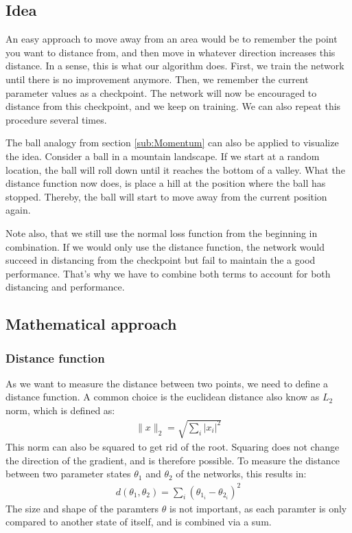 \subsection{Idea}
An easy approach to move away from an area would be to remember the point you
want to distance from, and then move in whatever direction increases this
distance. In a sense, this is what our algorithm does. First, we train the
network until there is no improvement anymore. Then, we remember the current
parameter values as a checkpoint. The network will now be encouraged to distance
from this checkpoint, and we keep on training. We can also repeat this procedure
several times.

The ball analogy from section \ref{sub:Momentum} can also be applied to
visualize the idea. Consider a ball in a mountain landscape. If we start at a
random location, the ball will roll down until it reaches the bottom of a
valley. What the distance function now does, is place a hill at the position
where the ball has stopped. Thereby, the ball will start to move away from the
current position again.

Note also, that we still use the normal loss function from the beginning in
combination. If we would only use the distance function, the network would
succeed in distancing from the checkpoint but fail to maintain the a good
performance. That's why we have to combine both terms to account for both
distancing and performance.

\subsection{Mathematical approach}
\subsubsection{Distance function}\label{distance_function}
As we want to measure the distance between two points, we need to define a
distance function. A common choice is the euclidean distance also know as $L_2$
norm, which is defined as: 
\begin{align}
    \rVert x \lVert_2 = \sqrt{\sum_i \lvert x_i \rvert^2}
\end{align}
This norm can also be squared to get rid of the root. Squaring does not change
the direction of the gradient, and is therefore possible. To measure the
distance between two parameter states $\theta_1$ and $\theta_2$ of the networks,
this results in:
\begin{align}\label{eq:distance}
    d(\theta_1, \theta_2)= \sum_i (\theta_{1_i}-\theta_{2_i})^2
\end{align}
The size and shape of the paramters $\theta$ is not important, as each paramter
is only compared to another state of itself, and is combined via a sum.

